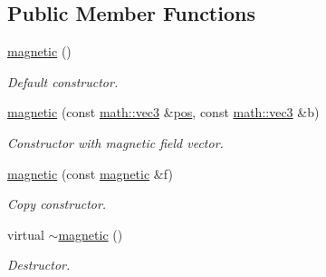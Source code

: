 \subsection*{Public Member Functions}
\begin{DoxyCompactItemize}
\item 
\hyperlink{classphysim_1_1fields_1_1magnetic_a4bc1ebfece31aa73f3242850314dcaac}{magnetic} ()
\begin{DoxyCompactList}\small\item\em Default constructor. \end{DoxyCompactList}\item 
\mbox{\label{classphysim_1_1fields_1_1magnetic_ae7e5039ac9ffa0e4283698c6215ae8cf}} 
\hyperlink{classphysim_1_1fields_1_1magnetic_ae7e5039ac9ffa0e4283698c6215ae8cf}{magnetic} (const \hyperlink{structphysim_1_1math_1_1vec3}{math\+::vec3} \&\hyperlink{classphysim_1_1fields_1_1punctual_a00344d6f3e4f3f841e7d876918c66977}{pos}, const \hyperlink{structphysim_1_1math_1_1vec3}{math\+::vec3} \&b)
\begin{DoxyCompactList}\small\item\em Constructor with magnetic field vector. \end{DoxyCompactList}\item 
\mbox{\label{classphysim_1_1fields_1_1magnetic_a573c07a7a049bebe1f47eef6621cc2cd}} 
\hyperlink{classphysim_1_1fields_1_1magnetic_a573c07a7a049bebe1f47eef6621cc2cd}{magnetic} (const \hyperlink{classphysim_1_1fields_1_1magnetic}{magnetic} \&f)
\begin{DoxyCompactList}\small\item\em Copy constructor. \end{DoxyCompactList}\item 
\mbox{\label{classphysim_1_1fields_1_1magnetic_a8263839cd27980407f2480601e677f4a}} 
virtual \hyperlink{classphysim_1_1fields_1_1magnetic_a8263839cd27980407f2480601e677f4a}{$\sim$magnetic} ()
\begin{DoxyCompactList}\small\item\em Destructor. \end{DoxyCompactList}\item 
\mbox{\label{classphysim_1_1fields_1_1magnetic_a405a791a9e5a711eb6a43de73462c609}} 

\end{DoxyCompactItemize}
